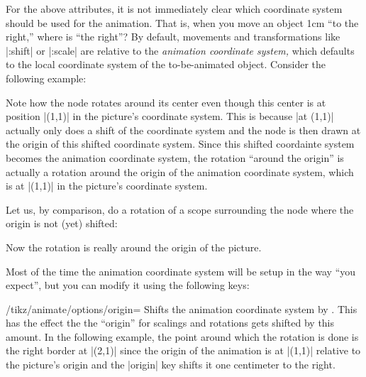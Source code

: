 For the above attributes, it is not immediately clear which coordinate
system should be used for the animation. That is, when you move an
object 1cm ``to the right,'' where is ``the right''? 
By default, movements and transformations like |:shift| or |:scale|
are relative to the \emph{animation coordinate system,} which defaults
to the local coordinate system of the to-be-animated object. Consider
the following example:
\begin{codeexample}[animation list={0.5,1,1.5,2}]
\end{codeexample}
Note how the node rotates around its center even though this center is
at position |(1,1)| in the picture's coordinate system. This is
because |at (1,1)| actually only does a shift of the coordinate system
and the node is then drawn at the origin of this shifted coordinate
system. Since this shifted coordainte system becomes the animation
coordinate system, the rotation ``around the origin'' is actually a
rotation around the origin of the animation coordinate system, which
is at |(1,1)| in the picture's coordinate system.

Let us, by comparison, do a rotation of a scope surrounding the node
where the origin is not (yet) shifted:
\begin{codeexample}[animation list={0.5,1,1.5,2}]
\end{codeexample}
Now the rotation is really around the origin of the picture.

Most of the time the animation coordinate system will be setup in the
way ``you expect'', but you can modify it using the following keys:

\begin{key}{/tikz/animate/options/origin=}
  Shifts the animation coordinate system by . This
  has the effect the the ``origin'' for scalings and rotations gets
  shifted by this amount. In the following example, the point around
  which the rotation is done is the right border at |(2,1)| since the
  origin of the animation is at |(1,1)| relative to the picture's
  origin and the |origin| key shifts it one centimeter to the right.
\begin{codeexample}[animation list={0.5,1,1.5,2}]
\end{codeexample}
\end{key}

